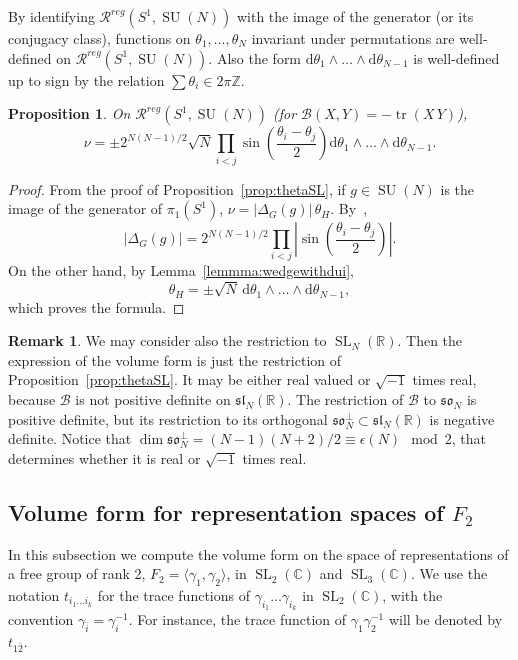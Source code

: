 \documentclass[11pt]{article}
\newtheorem{prop}[theo]{Proposition}
\theoremstyle{definition}
\newtheorem{rema}[theo]{Remark}
\numberwithin{equation}{section}
\numberwithin{figure}{section}
\numberwithin{table}{section}
\DeclareMathOperator{\SL}{SL}
\DeclareMathOperator{\SU}{SU}
\DeclareMathOperator{\tr}{tr}
\newcommand{\Bcal}{\mathcal{B}}
\newcommand{\Rcal}{\mathcal{R}}
\newcommand{\Cbb}{\mathbb{C}}
\newcommand{\Zbb}{\mathbb{Z}}
\newcommand{\Rbb}{\mathbb {R}}
\newcommand{\slfrk}{\mathfrak{sl}}
\newcommand{\sofrk}{\mathfrak{so}}
\newcommand*{\dd}{\mathrm{d}}
\newcommand{\SUn}{\SU(N)}
\begin{document}
By identifying $\Rcal^{reg}(S^1, \SUn)$ with the image of the generator (or its conjugacy class), functions on $\theta_1,\dots,\theta_N$ invariant under permutations are well-defined on $\Rcal^{reg}(S^1, \SUn)$. Also the form $\dd\theta_1\wedge\dots\wedge \dd \theta_{N-1}$ is well-defined up to sign by the relation $\sum\theta_i\in 2\pi\Zbb$.

\begin{prop}\label{prop:SUn}
On $\Rcal^{reg}(S^1, \SUn)$ (for $\Bcal(X,Y)=-\tr(X\, Y)$),
\[
\nu= \pm 2^{N(N-1)/2} \sqrt{N} \prod_{i<j} \sin\left(\frac{\theta_i-\theta_j}{2}\right) \dd\theta_1\wedge\dots\wedge \dd \theta_{N-1}.
\]
\end{prop}

\begin{proof}
From the proof of Proposition~\ref{prop:thetaSL}, if $g\in \SUn $ is the image of the generator of $\pi_1(S^1)$, $\nu= \vert \Delta_{G}({g})\vert \,\theta_{H} $. By~\cite[Exercise~7.3.5]{GoodWall},
\[
\vert \Delta_{G}({g}) \vert = 2^{N(N-1)/2} \prod_{i<j} \left\vert \sin\left(\frac{\theta_i-\theta_j}{2}\right) \right\vert.
\]
On the other hand, by Lemma~\ref{lemmma:wedgewithdui},
\[
\theta_{H}= \pm\sqrt{N} \, \dd\theta_1\wedge\dots\wedge \dd \theta_{N-1},
\]
which proves the formula.
\end{proof}

\begin{rema}\label{rem:SLnR}
We may consider also the restriction to $\SL_N(\Rbb)$. Then the expression of the volume form is just the restriction of Proposition~\ref{prop:thetaSL}. It may be either real valued or $\sqrt{-1}$ times real, because $\Bcal$ is not positive definite on $\slfrk_N(\Rbb)$. The restriction of $\Bcal$ to $\sofrk_N$ is positive definite, but its restriction to its orthogonal $\sofrk_N^\perp\subset \slfrk_N(\Rbb)$ is negative definite. Notice that $\dim \sofrk_N^\perp =(N-1)(N+2)/2\equiv \epsilon (N) \mod 2$, that determines whether it is real or $\sqrt{-1}$ times real.
\end{rema}



\subsection{Volume form for representation spaces of \texorpdfstring{$F_2$}{F2}}

In this subsection we compute the volume form on the space of representations of a free group of rank 2, $F_2=\langle \gamma_1,\gamma_2\rangle$, in $\SL_2(\Cbb)$ and $\SL_3(\Cbb)$. We use the notation $t_{i_1\dots i_k}$ for the trace functions of $\gamma_{i_1}\dots \gamma_{i_k}$ in $\SL_2(\Cbb)$, with the convention $\gamma_{\bar i}=\gamma_i ^{-1}$. For instance, the trace function of $\gamma_1\gamma_2^{-1}$ will be denoted by $t_{1\bar 2}$.
\end{document}
